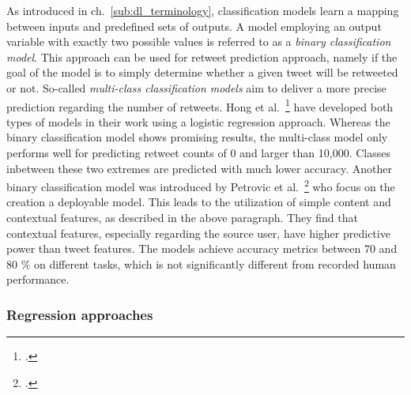 As introduced in ch.~\ref{sub:dl_terminology}, classification models learn a
mapping between inputs and predefined sets of outputs.
A model employing an output variable with exactly two possible values is referred
to as a \textit{binary classification model}.
This approach can be used for retweet prediction approach, namely if the goal
of the model is to simply determine whether a given tweet will be retweeted
or not.
So-called \textit{multi-class classification models} aim to deliver a more
precise prediction regarding the number of retweets.
Hong et al.~\footcite{Hong2011} have developed both types of models in their work
using a logistic regression approach.
Whereas the binary classification model shows promising results, the multi-class
model only performs well for predicting retweet counts of 0 and larger than
10,000.
Classes inbetween these two extremes are predicted with much lower accuracy.
Another binary classification model was introduced by Petrovic et al.~\footcite{Petrovic2011}
who focus on the creation a deployable model.
This leads to the utilization of simple content and contextual features, as described
in the above paragraph.
They find that contextual features, especially regarding the source user,
have higher predictive power than tweet features.
The models achieve accuracy metrics between 70 and 80 \% on different tasks,
which is not significantly different from recorded human performance.

\subsubsection{Regression approaches}

